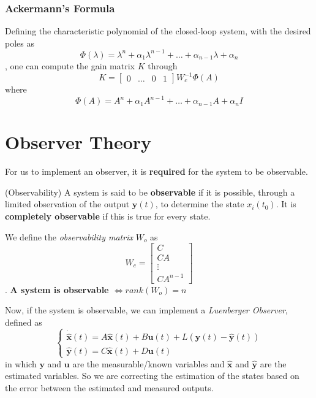 \documentclass[a4paper]{report}
\begin{document}
\subsubsection*{Ackermann's Formula}

Defining the characteristic polynomial of the closed-loop system, with the desired poles as \[
    \Phi(\lambda) = \lambda^{n} + \alpha_1\lambda^{n-1} + \ldots + \alpha_{n-1}\lambda + \alpha_n
\], one can compute the gain matrix $K$ through \[
    K = \begin{bmatrix} 0 & \ldots & 0 & 1 \end{bmatrix} W_c^{-1}\Phi(A)
\] where \[
\Phi(A) = A^{n} + \alpha_1A^{n-1} + \ldots + \alpha_{n-1}A + \alpha_nI
\] 
\section*{Observer Theory}

For us to implement an observer, it is \textbf{required} for the system to be observable.

\begin{definition}
    (Observability) A system is said to be \textbf{observable} if it is possible, through a limited observation of the output $\bm{y}(t)$, to determine the state $x_i(t_0)$. It is \textbf{completely observable} if this is true for every state.

    We define the \emph{observability matrix} $W_o$ as \[
    W_c = \begin{bmatrix} C \\ CA \\ \vdots \\ CA^{n-1} \end{bmatrix} 
    \]. \textbf{A system is observable $\iff rank\left( W_o \right) = n$}
\end{definition}

Now, if the system is observable, we can implement a \emph{Luenberger Observer}, defined as \[
\begin{cases}
    \dot{\bm{\hat{x}}}(t) = A\bm{\hat{x}}(t) + B\bm{u}(t) + L\left( \bm{y}(t) - \bm{\hat{y}}(t)\right) \\
    \bm{\hat{y}}(t) = C\bm{\hat{x}}(t) + D\bm{u}(t)
\end{cases}
\] in which $\bm{y}$ and $\bm{u}$ are the measurable/known variables and $\hat{\bm{x}}$ and $\bm{\hat{y}}$ are the estimated variables. So we are correcting the estimation of the states based on the error between the estimated and measured outputs.
\end{document}
